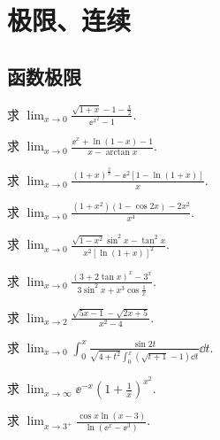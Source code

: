 	\section{极限、连续}
	\subsection{函数极限}
	\begin{ti}
		求 $\lim_{x\to 0} \frac{\sqrt{1+x} - 1 - \frac{x}{2}}{\ee^{x^{2}}-1}$.
	\end{ti}

	\begin{ti}
		求 $\lim_{x \to 0} \frac{\ee^{x} + \ln(1 - x) - 1}{x - \arctan x}$.
	\end{ti}

	\begin{ti}
		求 $\lim_{x \to 0} \frac{(1+x)^{\frac{2}{x}} - \ee^{2}[1 - \ln(1+x)]}{x}$.
	\end{ti}

	\begin{ti}
		求 $\lim_{x \to 0} \frac{\left(1 + x^{2}\right)(1 - \cos 2x) - 2x^{2}}{x^{4}}$.
	\end{ti}

	\begin{ti}
		求 $\lim_{x \to 0} \frac{\sqrt{1-x^{2}} \sin^{2}x - \tan^{2}x }{x^{2}[\ln(1+x)]^{2}}$.
	\end{ti}

	\begin{ti}
		求 $\lim_{x \to 0} \frac{(3 + 2 \tan x)^{x} - 3^{x}}{3 \sin^{2}x + x^{3} \cos\frac{1}{x}}$.
	\end{ti}

	\begin{ti}
		求 $\lim_{x \to 2}\frac{\sqrt{5x - 1} - \sqrt{2x + 5}}{x^{2} - 4}$.
	\end{ti}

	\begin{ti}
		求 $\lim_{x \to 0}\int_{0}^{x} \frac{\sin 2t}{\sqrt{4+t^{2}}\int_{0}^{x} \left(\sqrt{t+1} - 1\right)\dd{t}} \dd{t}$.
	\end{ti}

	\begin{ti}
		求 $\lim_{x \to \infty} \ee^{-x} \left( 1 + \frac{1}{x} \right)^{x^{2}}$.
	\end{ti}

	\begin{ti}
		求 $\lim_{x \to 3^{+}} \frac{\cos x \ln (x - 3)}{\ln\left( \ee^{x} - \ee^{3} \right)}$.
	\end{ti}


